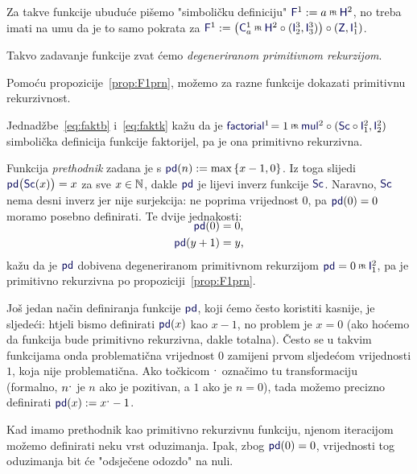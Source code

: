 \begin{definicija}\label{def:F1prn}
Za takve funkcije ubuduće pišemo "simboličku definiciju" $\f F^1:=a\pr\f H^2$, no treba imati na umu da je to samo pokrata za $\f F^1:=\bigl(\f C_a^1\pr\f H^2\circ(\f I_2^3,\f I_3^3)\bigr)\circ(\f Z,\f I_1^1)$.

Takvo zadavanje funkcije zvat ćemo \emph{degeneriranom primitivnom rekurzijom}.
\end{definicija}

Pomoću propozicije~\ref{prop:F1prn}, možemo za razne funkcije dokazati primitivnu rekurzivnost.%

\begin{primjer}\label{pr:factorialprn}
Jednadžbe~\eqref{eq:faktb} i~\eqref{eq:faktk} kažu da je $\f{factorial}^1\!=1\pr\f{mul}^2\circ(\f{Sc}\circ\f I_1^2,\f I_2^2)$ simbolička definicija funkcije faktorijel, pa je ona primitivno rekurzivna.
\end{primjer}

\begin{primjer}
Funkcija \emph{prethodnik} zadana je s $\f{pd}(n):=\max\,\{x-1,0\}$. Iz toga slijedi $\f{pd}\bigl(\f{Sc}(x)\bigr)=x$ za sve $x\in{\mathbb N}$, dakle $\f{pd}$ je lijevi inverz funkcije $\f{Sc}$. Naravno, $\f{Sc}$ nema desni inverz jer nije surjekcija: ne poprima vrijednost $0$, pa $\f{pd}(0)=0$ moramo posebno definirati. Te dvije jednakosti:
\begin{align}
\SwapAboveDisplaySkip
    \f{pd}(0)&=0\text,\\
    \f{pd}(y+1)&=y\text,
\end{align}
kažu da je $\f{pd}$ dobivena degeneriranom primitivnom rekurzijom $\f{pd}=0\pr\f I_1^2$, pa je primitivno rekurzivna po propoziciji~\ref{prop:F1prn}.
\end{primjer}

\begin{napomena}\label{nap:crtica}
Još jedan način definiranja funkcije $\f{pd}$, koji ćemo često koristiti kasnije, je sljedeći: htjeli bismo definirati $\f{pd}(x)$ kao $x-1$, no problem je $x=0$ (ako hoćemo da funkcija bude primitivno rekurzivna, dakle totalna). Često se u takvim funkcijama onda problematična vrijednost $0$ zamijeni prvom sljedećom vrijednosti $1$, koja nije problematična. Ako točkicom $\sp{\text{\normalsize.}}$ označimo tu transformaciju (formalno, $n\sp{\text{\normalsize.}}$ je $n$ ako je pozitivan, a $1$ ako je $n=0$), tada možemo precizno definirati $\f{pd}(x):=x\bump-1$.
\end{napomena}

Kad imamo prethodnik kao primitivno rekurzivnu funkciju, njenom iteracijom mo\-že\-mo definirati neku vrst oduzimanja. Ipak, zbog $\f{pd}(0)=0$, vrijednosti tog oduzimanja bit će "odsječene odozdo" na nuli.

